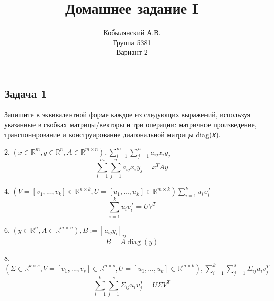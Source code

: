 \documentclass{article}
\title{Домашнее задание I}
\author{Кобылянский А.В. \\ Группа 5381 \\ Вариант 2}
\date {}
\DeclareMathOperator{\diag}{diag}
\begin{document}

    \maketitle
    \newpage
         
    \subsection*{Задача 1}
    
    Запишите в эквивалентной форме каждое из следующих выражений, используя
 указанные в скобках матрицы/векторы и три      
    операции: матричное произведение,
 транспонирование и конструирование диагональной матрицы diag(𝑥).
    \bigbreak
     
    2. $ (x \in \mathbb{R}^m, y \in \mathbb{R}^n, A \in \mathbb{R}^{m \times n}), 
    \sum_{i=1}^{m} \sum_{j=1}^{n} a_{ij}x_{i}y_{j} $    
    \begin{equation*}
         \sum_{i=1}^{m} \sum_{j=1}^{n} a_{ij}x_{i}y_{j} = x^{T}Ay
    \end{equation*}
 
    4. $ (V = [v_1, ..., v_k] \in \mathbb{R}^{n \times k}, U = [u_1, ..., u_k] \in \mathbb{R}^{m \times k})\sum_{i=1}^{k} u_{i}v_{i}^{T} $    
    \begin{equation*}
         \sum_{i=1}^{k} u_{i}v_{i}^{T} = UV^T
    \end{equation*}
    
    6. $(y \in \mathbb{R}^n, A \in \mathbb{R}^{m \times n}), B := [a_{ij}y_i]_{ij}$
    \begin{equation*}
         B = A\diag(y)
    \end{equation*}
    
    8. $
    (\Sigma \in \mathbb{R}^{k \times s}, 
    V = [v_1, ..., v_s] \in \mathbb{R}^{n \times s},
    U = [u_1, ..., u_k] \in \mathbb{R}^{m \times k}), 
    \sum_{i=1}^{k} \sum_{j = 1}^{s} \Sigma_{ij}u_i v_j^T 
    $
    \begin{equation*}
        \sum_{i=1}^{k} \sum_{j = 1}^{s} \Sigma_{ij}u_i v_j^T = U\Sigma V^T
    \end{equation*}
    
\end{document}
